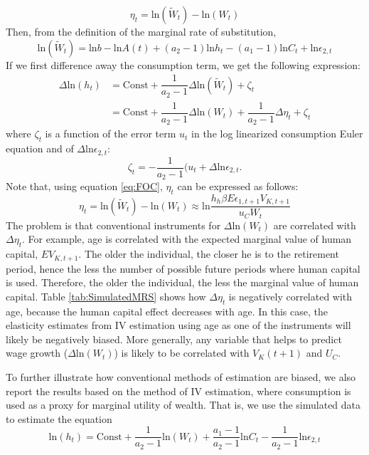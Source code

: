 \documentclass{article}
\begin{document}
      $$ \eta_t = \text{ln}(\tilde{W}_t) - \text{ln}(W_t) $$
    Then, from the definition of the marginal rate of substitution,
    $$  \text{ln}(\tilde{W}_t) =  \text{ln} b -  \text{ln} A(t) + (a_2 - 1)  \text{ln} h_t - (a_1 - 1)  \text{ln} C_t +  \text{ln} \epsilon_{2,t}$$
    If we first difference away the consumption term, we get the following expression:
    \begin{equation*}
      \begin{split}
        \Delta  \text{ln}(h_t) & = \text{Const} + \dfrac{1}{a_2 - 1} \Delta  \text{ln} (\tilde{W}_t) + \zeta_t \\
        & =  \text{Const} + \dfrac{1}{a_2 - 1} \Delta  \text{ln} (W_t) + \dfrac{1}{a_2 - 1} \Delta \eta_t + \zeta_t
           \end{split}
          \end{equation*}
        where $\zeta_t$ is a function of the error term $u_t$ in the log linearized consumption Euler equation and of $\Delta \text{ln} \epsilon_{2,t}$:
        $$ \zeta_t = -\dfrac{1}{a_2-1}(u_t + \Delta \text{ln} \epsilon_{2,t}.$$
        Note that, using equation \eqref{eq:FOC}, $\eta_t$ can be expressed as follows:
        $$ \eta_t = \text{ln} (\tilde{W}_t) -\text{ln} (W_t) \approx \text{ln} \dfrac{h_h \beta E \epsilon_{1,t+1} V_{K,t+1}}{u_C W_t}$$
        The problem is that conventional instruments for $\Delta \text{ln}(W_t)$ are correlated with $\Delta \eta_t$. For example, age is correlated with the expected marginal value of human capital, $E V_{K,t+1}$. The older the individual, the closer he is to the retirement period, hence the less the number of possible future periods where human capital is used. Therefore, the older the individual, the less the marginal value of human capital. Table \ref{tab:SimulatedMRS} shows how $\Delta \eta_t$ is negatively correlated with age, because the human capital effect decreases with age. In this case, the elasticity estimates from IV estimation using age as one of the instruments will likely be negatively biased. More generally, any variable that helps to predict wage growth ($\Delta \text{ln}(W_t)$) is likely to be correlated with $V_K (t + 1)$ and $U_C$. \par
        To further illustrate how conventional methods of estimation are biased, we also report the results based on the \cite{Altonji1986-zf} method of IV estimation, where consumption is used as a proxy for marginal utility of wealth. That is, we use the simulated data to estimate the equation
        $$ \text{ln}(h_t) = \text{Const} + \dfrac{1}{a_2 - 1} \text{ln}(W_t) + \dfrac{a_1 -1}{a_2 - 1} \text{ln} C_t - \dfrac{1}{a_2 - 1} \text{ln} \epsilon_{2,t}$$
\end{document}
